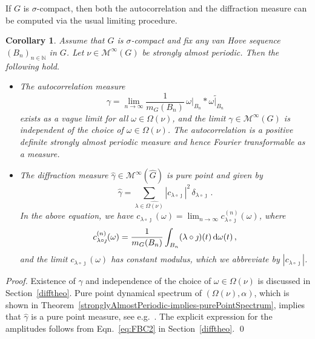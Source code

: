 \documentclass[11pt, a4wide]{amsart}
\newcommand{\MTB}{\mathcal{M}^{\infty}(G)}
\newtheorem{corollary}[lemma]{Corollary}
\numberwithin{lemma}{section}
\begin{document}
If $G$ is $\sigma$-compact, then both the autocorrelation and the diffraction measure can be computed via the usual limiting procedure.



\begin{corollary}\label{cor:diff}
Assume that $G$ is $\sigma$-compact and fix any van Hove sequence $(B_n)_{n\in \mathbb N}$ in $G$.
Let $\nu\in \MTB$ be strongly almost periodic. Then the following hold.
%
\begin{itemize}
\item[(i)] The autocorrelation measure
%
\begin{displaymath}
\gamma = \lim_{n \to \infty} \frac{1}{m_G(B_n)} \, \omega|_{B_n} \ast \widetilde{\omega|_{B_n}}
\end{displaymath}
%
exists as a vague limit for all $\omega \in \Omega(\nu)$, and the limit $\gamma\in\MTB$ is independent of the choice of $\omega\in\Omega(\nu)$.  The autocorrelation is a positive definite strongly almost periodic measure and hence Fourier transformable as a measure.

\item[(ii)] The diffraction measure  $\widehat{\gamma}\in \mathcal M^\infty(\widehat G)$ is pure point and given by
%
\begin{displaymath}
\widehat{\gamma} = \sum_{\lambda \in \widehat{\Omega(\nu)}} |c_{\lambda\circ \jmath }|^2\, \delta_{\lambda \circ \jmath}\,.
\end{displaymath}
%
In the above equation, we have
$c_{\lambda\circ \jmath }(\omega) = \lim_{n \to \infty} c_{\lambda\circ \jmath}^{(n)}(\omega)$, where
%
\begin{displaymath}
c_{\lambda\circ \jmath}^{(n)} (\omega) = \frac{1}{m_G(B_n)}  \int_{B_n} (\lambda \circ \jmath)(t) \, {\rm d}\omega(t) \,,
\end{displaymath}
%
and the limit $c_{\lambda\circ \jmath }(\omega)$ has constant modulus, which we abbreviate by $|c_{\lambda\circ \jmath }|$.
\end{itemize}
\end{corollary}

\begin{proof}
Existence of $\gamma$ and independence of the choice of $\omega\in \Omega(\nu)$ is discussed in Section~\ref{difftheo}. Pure point dynamical spectrum of $(\Omega(\nu),\alpha)$, which is shown in Theorem~\ref{stronglyAlmostPeriodic-implies-purePointSpectrum}, implies that $\widehat\gamma$ is a pure point measure, see e.g.~\cite{Martin2}. The explicit expression for the amplitudes follows from Eqn.~\eqref{eq:FBC2} in Section~\ref{difftheo}.
\qed
\end{proof}
\end{document}

